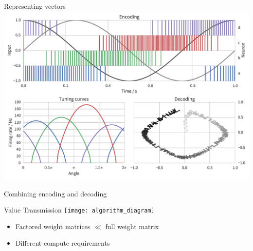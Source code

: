 \documentclass[t]{beamer}
\begin{document}
  \begin{frame}[plain]{Representing vectors}
    \vfill
    \includegraphics[width=\textwidth]{encoding_decoding2d}
    \vfill
  \end{frame}

  \begin{frame}{Combining encoding and decoding}
  \end{frame}


  \begin{frame}{Value Transmission}
    \vfill
    \hspace*{-.15\textwidth}\texttt{[image: algorithm\_diagram]}
    \vfill
    \pause
    \begin{itemize}
      \item Factored weight matrices $\ll$ full weight matrix
      \item Different compute requirements
    \end{itemize}
  \end{frame}



\end{document}

